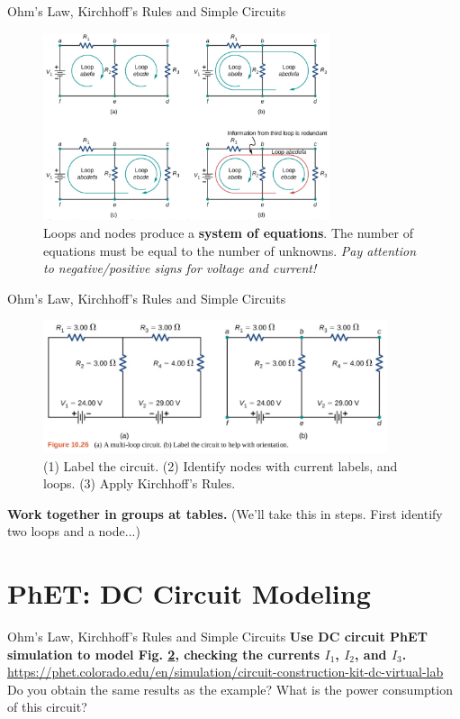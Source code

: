 \documentclass{beamer}
\begin{document}
\begin{frame}{Ohm's Law, Kirchhoff's Rules and Simple Circuits}
\small
\begin{figure}
\centering
\includegraphics[width=0.75\textwidth]{figures/batt8.png}
\caption{\label{fig:batt7} Loops and nodes produce a \textbf{system of equations}. The number of equations must be equal to the number of unknowns.  \textit{Pay attention to negative/positive signs for voltage and current!}}
\end{figure}
\end{frame}

\begin{frame}{Ohm's Law, Kirchhoff's Rules and Simple Circuits}
\small
\begin{figure}
\centering
\includegraphics[width=0.9\textwidth]{figures/example1026.png}
\caption{\label{fig:batt8} (1) Label the circuit. (2) Identify nodes with current labels, and loops. (3) Apply Kirchhoff's Rules.}
\end{figure}
\textbf{Work together in groups at tables.} (We'll take this in steps.  First identify two loops and a node...)
\end{frame}

\section{PhET: DC Circuit Modeling}

\begin{frame}{Ohm's Law, Kirchhoff's Rules and Simple Circuits}
\textbf{Use DC circuit PhET simulation to model Fig. \ref{fig:batt8}, checking the currents $I_1$, $I_2$, and $I_3$.} \\ \vspace{1cm}
\url{https://phet.colorado.edu/en/simulation/circuit-construction-kit-dc-virtual-lab} \\ \vspace{1cm}
Do you obtain the same results as the example?  What is the power consumption of this circuit?
\end{frame}
\end{document}
